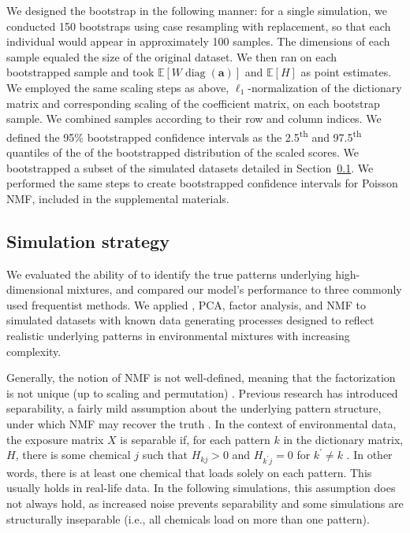We designed the bootstrap in the following manner: for a single simulation, we conducted 150 bootstraps using case resampling with replacement, so that each individual would appear in approximately 100 samples. The dimensions of each sample equaled the size of the original dataset. We then ran \bnmf on each bootstrapped sample and took $\mathbb{E}\left[W\operatorname{diag}(\mathbf{a})\right]$ and $\mathbb{E}\left[H\right]$ as point estimates. We employed the same scaling steps as above, $\ell_1$-normalization of the dictionary matrix and corresponding scaling of the coefficient matrix, on each bootstrap sample. We combined samples according to their row and column indices. We defined the 95\% bootstrapped confidence intervals as the 2.5\textsuperscript{th} and 97.5\textsuperscript{th} quantiles of the of the bootstrapped distribution of the scaled scores. We bootstrapped a subset of the simulated datasets detailed in Section~\ref{methods_sim}. We performed the same steps to create bootstrapped confidence intervals for Poisson NMF, included in the supplemental materials.

\subsection{Simulation strategy}
\label{methods_sim}
We evaluated the ability of \bnmf to identify the true patterns underlying high-dimensional mixtures, and compared our model's performance to three commonly used frequentist methods. We applied \bnmfc, PCA, factor analysis, and NMF to simulated datasets with known data generating processes designed to reflect realistic underlying patterns in environmental mixtures with increasing complexity.

Generally, the notion of NMF is not well-defined, meaning that the factorization is not unique (up to scaling and permutation) \cite{laurberg2008theorems}. Previous research has introduced separability, a fairly mild assumption about the underlying pattern structure, under which NMF may recover the truth \cite{donoho2004does}. In the context of environmental data, the exposure matrix $X$ is separable if, for each pattern $k$ in the dictionary matrix, $H$, there is some chemical $j$ such that $H_{k j} > 0$ and $H_{k^{\prime} j}=0$ for $k^{\prime} \neq k$ \cite{arora2012learning}. In other words, there is at least one chemical that loads solely on each pattern. This usually holds in real-life data. In the following simulations, this assumption does not always hold, as increased noise prevents separability and some simulations are structurally inseparable (i.e., all chemicals load on more than one pattern). 

